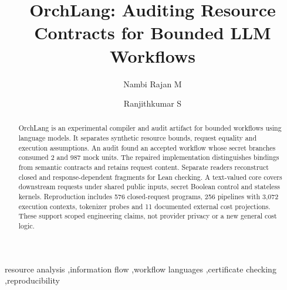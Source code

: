 \documentclass[preprint,12pt,a4paper]{elsarticle}
\begin{document}
\begin{frontmatter}
\title{OrchLang: Auditing Resource Contracts for Bounded LLM Workflows}
\author[ci]{Nambi Rajan M}
\author[analytics]{Ranjithkumar S}
\address[ci]{Department of Computational Intelligence, SCOPE, Vellore Institute of Technology, India}
\address[analytics]{Department of Analytics, SCOPE, Vellore Institute of Technology, India}
\begin{abstract}
OrchLang is an experimental compiler and audit artifact for bounded workflows using language models. It separates synthetic resource bounds, request equality and execution assumptions. An audit found an accepted workflow whose secret branches consumed 2 and 987 mock units. The repaired implementation distinguishes bindings from semantic contracts and retains request content. Separate readers reconstruct closed and response-dependent fragments for Lean checking. A text-valued core covers downstream requests under shared public inputs, secret Boolean control and stateless kernels. Reproduction includes 576 closed-request programs, 256 pipelines with 3,072 execution contexts, tokenizer probes and 11 documented external cost projections. These support scoped engineering claims, not provider privacy or a new general cost logic.
\end{abstract}
\begin{keyword}
resource analysis \sep information flow \sep workflow languages \sep certificate checking \sep reproducibility
\end{keyword}
\end{frontmatter}
\clearpage
\end{document}
